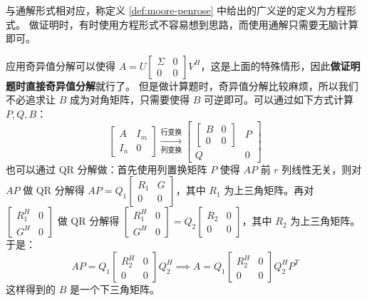 \begin{remark}
与通解形式相对应，称定义 \ref{def:moore-penrose} 中给出的广义逆的定义为方程形式。
做证明时，有时使用方程形式不容易想到思路，而使用通解只需要无脑计算即可。
\end{remark}
\begin{remark}
应用奇异值分解可以使得 $A=U\begin{bmatrix}\Sigma&0\\0&0\end{bmatrix}V^H$，这是上面的特殊情形，因此\textbf{做证明题时直接奇异值分解}就行了。
但是做计算题时，奇异值分解比较麻烦，所以我们不必追求让 $B$ 成为对角矩阵，只需要使得 $B$ 可逆即可。可以通过如下方式计算 $P,Q,B$：
\[
    \begin{bmatrix}A&I_m\\I_n&0\end{bmatrix}\xrightarrow[\text{列变换}]{\text{行变换}}\begin{bmatrix}\begin{bmatrix}B&0\\0&0\end{bmatrix}&P\\Q&0\end{bmatrix}
\]
也可以通过 QR 分解做：首先使用列置换矩阵 $P$ 使得 $AP$ 前 $r$ 列线性无关，则对 $AP$ 做 QR 分解得 $AP=Q_1\begin{bmatrix}R_1&G\\0&0\end{bmatrix}$，其中 $R_1$ 为上三角矩阵。再对 $\begin{bmatrix}R_1^H&0\\G^H&0\end{bmatrix}$ 做 QR 分解得 $\begin{bmatrix}R_1^H&0\\G^H&0\end{bmatrix}=Q_2\begin{bmatrix}R_2&0\\0&0\end{bmatrix}$，其中 $R_2$ 为上三角矩阵。于是：
\[
    AP=Q_1\begin{bmatrix}R_2^H&0\\0&0\end{bmatrix}Q_2^H\implies A=Q_1\begin{bmatrix}R_2^H&0\\0&0\end{bmatrix}Q_2^HP^T
\]
这样得到的 $B$ 是一个下三角矩阵。
\end{remark}

